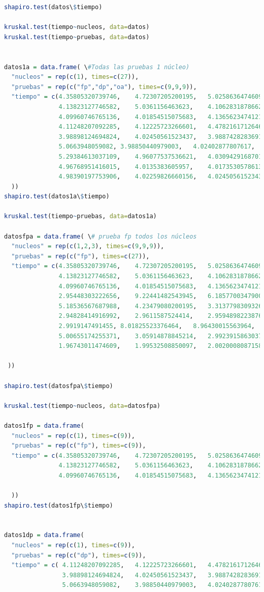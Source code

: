\documentclass{article}
\begin{document}
\begin{lstlisting}[language=R]
shapiro.test(datos\$tiempo)

kruskal.test(tiempo~nucleos, data=datos)
kruskal.test(tiempo~pruebas, data=datos)


datos1a = data.frame( \#Todas las pruebas 1 núcleo)
  "nucleos" = rep(c(1), times=c(27)),
  "pruebas" = rep(c("fp","dp","oa"), times=c(9,9,9)),
  "tiempo" = c(4.35805320739746,	4.72307205200195,	5.02586364746093,
               4.13823127746582,	5.0361156463623,	4.10628318786621,
               4.09960746765136,	4.01854515075683,	4.1365623474121,
               4.11248207092285,	4.12225723266601,	4.47821617126464,
               3.98898124694824,	4.02450561523437,	3.98874282836914,
               5.0663948059082,	3.98850440979003,	4.02402877807617,	
               5.29384613037109,	4.96077537536621,	4.03094291687011,
               4.96768951416015,	4.0135383605957,	4.01735305786132,	
               4.98390197753906,	4.02259826660156,	4.02450561523437
  ))
shapiro.test(datos1a\$tiempo)

kruskal.test(tiempo~pruebas, data=datos1a)

datosfpa = data.frame( \# prueba fp todos los núcleos
  "nucleos" = rep(c(1,2,3), times=c(9,9,9)),
  "pruebas" = rep(c("fp"), times=c(27)),
  "tiempo" = c(4.35805320739746,	4.72307205200195,	5.02586364746093,
               4.13823127746582,	5.0361156463623,	4.10628318786621,	
               4.09960746765136,	4.01854515075683,	4.1365623474121, 
               2.95448303222656,	9.22441482543945,	6.18577003479003,	
               5.18536567687988,	4.23479080200195,	3.31377983093261,	
               2.94828414916992,	2.9611587524414,	2.95948982238769, 
               2.9919147491455,	8.01825523376464,	8.96430015563964,	
               5.00655174255371,	3.05914878845214,	2.99239158630371,	
               1.96743011474609,	1.99532508850097,	2.00200080871582

 ))

shapiro.test(datosfpa\$tiempo)

kruskal.test(tiempo~nucleos, data=datosfpa)

datos1fp = data.frame(
  "nucleos" = rep(c(1), times=c(9)),
  "pruebas" = rep(c("fp"), times=c(9)),
  "tiempo" = c(4.35805320739746,	4.72307205200195,	5.02586364746093,
               4.13823127746582,	5.0361156463623,	4.10628318786621,
               4.09960746765136,	4.01854515075683,	4.1365623474121

  ))
shapiro.test(datos1fp\$tiempo)


datos1dp = data.frame(
  "nucleos" = rep(c(1), times=c(9)),
  "pruebas" = rep(c("dp"), times=c(9)),
  "tiempo" = c(	4.11248207092285,	4.12225723266601,	4.47821617126464,
                3.98898124694824,	4.02450561523437,	3.98874282836914,
                5.0663948059082,	3.98850440979003,	4.02402877807617
               

\end{lstlisting}
\end{document}
